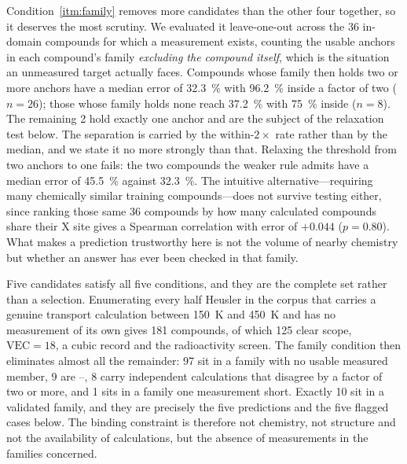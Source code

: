 Condition~\ref{itm:family} removes more candidates than the other four together, so it deserves the
most scrutiny. We evaluated it leave-one-out across the \num{36} in-domain compounds for which a
measurement exists, counting the usable anchors in each compound's family \emph{excluding the
compound itself}, which is the situation an unmeasured target actually faces. Compounds whose family
then holds two or more anchors have a median error of \SI{32.3}{\percent} with \SI{96.2}{\percent}
inside a factor of two ($n=\num{26}$); those whose family holds none reach \SI{37.2}{\percent} with
\SI{75}{\percent} inside ($n=\num{8}$). The remaining \num{2} hold exactly one anchor and are the
subject of the relaxation test below. The separation is carried by the within-$2\times$ rate
rather than by the median, and we state it no more strongly than that. Relaxing the threshold from
two anchors to one fails: the two compounds the weaker rule admits have a median error of
\SI{45.5}{\percent} against \SI{32.3}{\percent}. The intuitive alternative---requiring many
chemically similar training compounds---does not survive testing either, since ranking those same
\num{36} compounds by how many calculated compounds share their X site gives a Spearman correlation
with error of $+\num{0.044}$ ($p=\num{0.80}$). What makes a prediction trustworthy here is not the
volume of nearby chemistry but whether an answer has ever been checked in that family.

Five candidates satisfy all five conditions, and they are the complete set rather than a selection.
Enumerating every half Heusler in the corpus that carries a genuine transport calculation between
\SI{150}{\kelvin} and \SI{450}{\kelvin} and has no measurement of its own gives \num{181} compounds,
of which \num{125} clear scope, $\mathrm{VEC}=18$, a cubic record and the radioactivity screen. The
family condition then eliminates almost all the remainder: \num{97} sit in a family with no usable
measured member, \num{9} are --, \num{8} carry independent calculations that disagree
by a factor of two or more, and \num{1} sits in a family one measurement short. Exactly \num{10}
sit in a validated family, and they are precisely the five predictions and the five flagged cases
below. The binding constraint is therefore not chemistry, not structure and not the availability of
calculations, but the absence of measurements in the families concerned.

